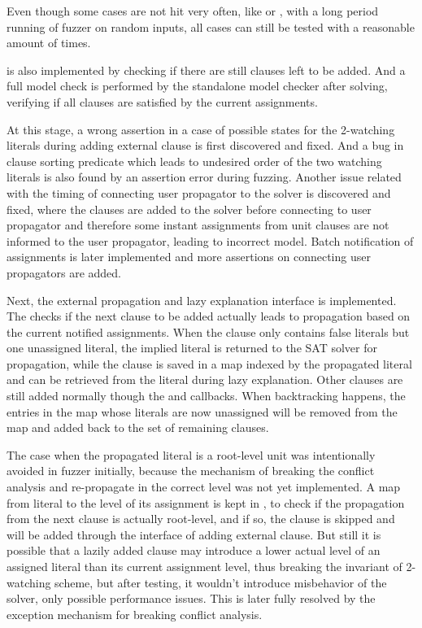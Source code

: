 Even though some cases are not hit very often, like  or , with a long period running of fuzzer on random inputs, all cases can still be tested with a reasonable amount of times.

 is also implemented by checking if there are still clauses left to be added. And a full model check is performed by the standalone model checker after solving, verifying if all clauses are satisfied by the current assignments.

At this stage, a wrong assertion in a case of possible states for the 2-watching literals during adding external clause is first discovered and fixed. And a bug in clause sorting predicate which leads to undesired order of the two watching literals is also found by an assertion error during fuzzing. Another issue related with the timing of connecting user propagator to the solver is discovered and fixed, where the clauses are added to the solver before connecting to user propagator and therefore some instant assignments from unit clauses are not informed to the user propagator, leading to incorrect model. Batch notification of assignments is later implemented and more assertions on connecting user propagators are added.

Next, the external propagation and lazy explanation interface is implemented. The  checks if the next clause to be added actually leads to propagation based on the current notified assignments. When the clause only contains false literals but one unassigned literal, the implied literal is returned to the SAT solver for propagation, while the clause is saved in a map indexed by the propagated literal and can be retrieved from the literal during lazy explanation. Other clauses are still added normally though the  and  callbacks. When backtracking happens, the entries in the map whose literals are now unassigned will be removed from the map and added back to the set of remaining clauses.

The case when the propagated literal is a root-level unit was intentionally avoided in fuzzer initially, because the mechanism of breaking the conflict analysis and re-propagate in the correct level was not yet implemented. A map from literal to the level of its assignment is kept in , to check if the propagation from the next clause is actually root-level, and if so, the clause is skipped and will be added through the interface of adding external clause. But still it is possible that a lazily added clause may introduce a lower actual level of an assigned literal than its current assignment level, thus breaking the invariant of 2-watching scheme, but after testing, it wouldn't introduce misbehavior of the solver, only possible performance issues. This is later fully resolved by the exception mechanism for breaking conflict analysis.


